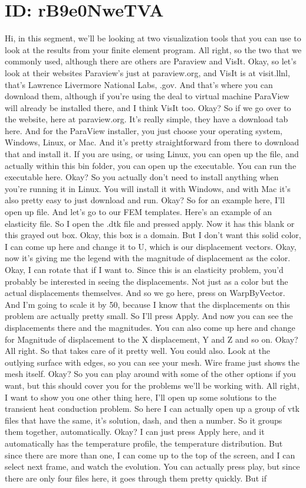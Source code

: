 \documentclass[10pt]{article}
\begin{document}
{\section*{ID: rB9e0NweTVA}
Hi, in this segment, we'll be looking at two visualization tools that you can use to look at the results from your finite element program. All right, so the two that we commonly used, although there are others are Paraview and VisIt. Okay, so let's look at their websites Paraview's just at paraview.org, and VisIt is at visit.llnl, that's Lawrence Livermore National Labs, .gov. And that's where you can download them, although if you're using the deal to virtual machine ParaView will already be installed there, and I think VisIt too. Okay? So if we go over to the website, here at paraview.org. It's really simple, they have a download tab here. And for the ParaView installer, you just choose your operating system, Windows, Linux, or Mac. And it's pretty straightforward from there to download that and install it. If you are using, or using Linux, you can open up the file, and actually within this bin folder, you can open up the executable. You can run the executable here. Okay? So you actually don't need to install anything when you're running it in Linux. You will install it with Windows, and with Mac it's also pretty easy to just download and run. Okay? So for an example here, I'll open up file. And let's go to our FEM templates. Here's an example of an elasticity file. So I open the .dtk file and pressed apply. Now it has this blank or this grayed out box. Okay, this box is a domain. But I don't want this solid color, I can come up here and change it to U, which is our displacement vectors. Okay, now it's giving me the legend with the magnitude of displacement as the color. Okay, I can rotate that if I want to. Since this is an elasticity problem, you'd probably be interested in seeing the displacements. Not just as a color but the actual displacements themselves. And so we go here, press on WarpByVector. And I'm going to scale it by 50, because I know that the displacements on this problem are actually pretty small. So I'll press Apply. And now you can see the displacements there and the magnitudes. You can also come up here and change for Magnitude of displacement to the X displacement, Y and Z and so on. Okay? All right. So that takes care of it pretty well. You could also. Look at the outlying surface with edges, so you can see your mesh. Wire frame just shows the mesh itself. Okay? So you can play around with some of the other options if you want, but this should cover you for the problems we'll be working with. All right, I want to show you one other thing here, I'll open up some solutions to the transient heat conduction problem. So here I can actually open up a group of vtk files that have the same, it's solution, dash, and then a number. So it groups them together, automatically. Okay? I can just press Apply here, and it automatically has the temperature profile, the temperature distribution. But since there are more than one, I can come up to the top of the screen, and I can select next frame, and watch the evolution. You can actually press play, but since there are only four files here, it goes through them pretty quickly. But if }
\end{document}
